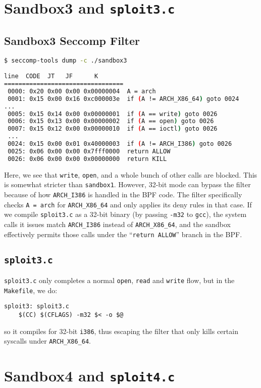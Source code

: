 \documentclass[11pt]{article}
\begin{document}
\section{Sandbox3 and \texttt{sploit3.c}}

\subsection{Sandbox3 Seccomp Filter}
\begin{lstlisting}[language=bash]
$ seccomp-tools dump -c ./sandbox3

line  CODE  JT   JF      K
=================================
 0000: 0x20 0x00 0x00 0x00000004  A = arch
 0001: 0x15 0x00 0x16 0xc000003e  if (A != ARCH_X86_64) goto 0024
...
 0005: 0x15 0x14 0x00 0x00000001  if (A == write) goto 0026
 0006: 0x15 0x13 0x00 0x00000002  if (A == open) goto 0026
 0007: 0x15 0x12 0x00 0x00000010  if (A == ioctl) goto 0026
 ...
 0024: 0x15 0x00 0x01 0x40000003  if (A != ARCH_I386) goto 0026
 0025: 0x06 0x00 0x00 0x7fff0000  return ALLOW
 0026: 0x06 0x00 0x00 0x00000000  return KILL
\end{lstlisting}

Here, we see that \texttt{write}, \texttt{open}, and a whole bunch of other calls are blocked. This is
somewhat stricter than \texttt{sandbox1}. However, 32-bit mode can bypass the filter because of how \texttt{ARCH\_I386} is handled in the BPF code. The filter specifically checks \texttt{A = arch} for \texttt{ARCH\_X86\_64} and only applies its deny rules in that case. If we compile \texttt{sploit3.c} as a 32-bit binary (by passing \texttt{-m32} to \texttt{gcc}), the system calls it issues match \texttt{ARCH\_I386} instead of \texttt{ARCH\_X86\_64}, and the sandbox effectively permits those calls under the ``\texttt{return ALLOW}'' branch in the BPF.

\subsection{\texttt{sploit3.c}}
\texttt{sploit3.c} only completes a normal \texttt{open}, \texttt{read} and \texttt{write} flow, but in the \texttt{Makefile}, we do:
\begin{lstlisting}
sploit3: sploit3.c
    $(CC) $(CFLAGS) -m32 $< -o $@
\end{lstlisting}
so it compiles for 32-bit \texttt{i386}, thus escaping the filter that only kills certain syscalls under \texttt{ARCH\_X86\_64}.

\section{Sandbox4 and \texttt{sploit4.c}}
\end{document}
